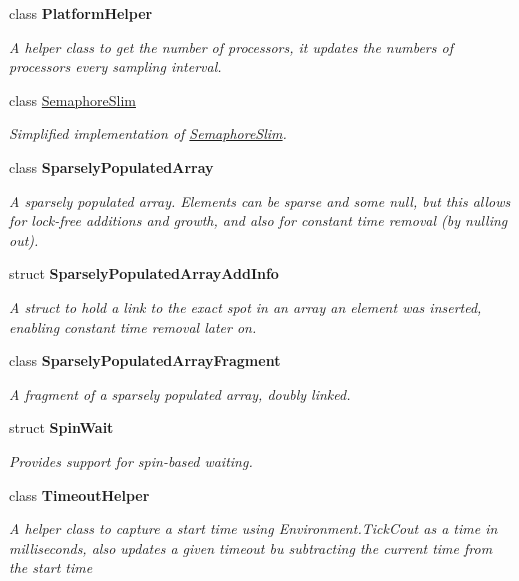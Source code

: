 \begin{DoxyCompactItemize}
class {\bfseries Platform\+Helper}
\begin{DoxyCompactList}\small\item\em A helper class to get the number of processors, it updates the numbers of processors every sampling interval. \end{DoxyCompactList}\item 
class \hyperlink{class_system_1_1_threading_1_1_semaphore_slim}{Semaphore\+Slim}
\begin{DoxyCompactList}\small\item\em Simplified implementation of \hyperlink{class_system_1_1_threading_1_1_semaphore_slim}{Semaphore\+Slim}. \end{DoxyCompactList}\item 
class {\bfseries Sparsely\+Populated\+Array}
\begin{DoxyCompactList}\small\item\em A sparsely populated array. Elements can be sparse and some null, but this allows for lock-\/free additions and growth, and also for constant time removal (by nulling out). \end{DoxyCompactList}\item 
struct {\bfseries Sparsely\+Populated\+Array\+Add\+Info}
\begin{DoxyCompactList}\small\item\em A struct to hold a link to the exact spot in an array an element was inserted, enabling constant time removal later on. \end{DoxyCompactList}\item 
class {\bfseries Sparsely\+Populated\+Array\+Fragment}
\begin{DoxyCompactList}\small\item\em A fragment of a sparsely populated array, doubly linked. \end{DoxyCompactList}\item 
struct {\bfseries Spin\+Wait}
\begin{DoxyCompactList}\small\item\em Provides support for spin-\/based waiting. \end{DoxyCompactList}\item 
class {\bfseries Timeout\+Helper}
\begin{DoxyCompactList}\small\item\em A helper class to capture a start time using Environment.\+Tick\+Cout as a time in milliseconds, also updates a given timeout bu subtracting the current time from the start time \end{DoxyCompactList}\end{DoxyCompactItemize}
